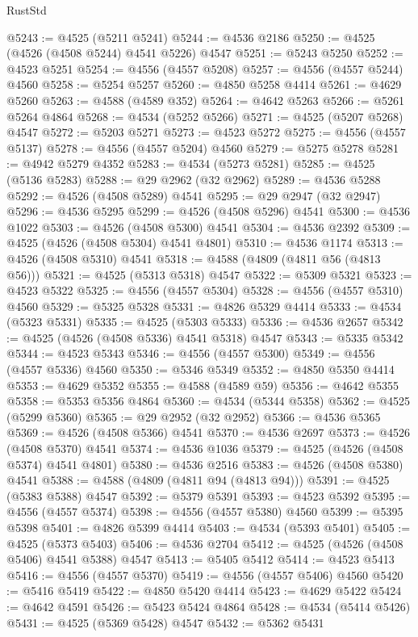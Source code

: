 \begin{lexlean}{RustStd}
\begin{coremodule}
{\begin{coremodule}
{{{{{{{{{{{{{{{{{{{{{{{{{{{{{{{{{{{{{{{{{{{{{{{{{{{{{{{@5243 := @4525 (@5211 @5241)
@5244 := @4536 @2186
@5250 := @4525 (@4526 (@4508 @5244) @4541 @5226) @4547
@5251 := @5243 @5250
@5252 := @4523 @5251
@5254 := @4556 (@4557 @5208)
@5257 := @4556 (@4557 @5244) @4560
@5258 := @5254 @5257
@5260 := @4850 @5258 @4414
@5261 := @4629 @5260
@5263 := @4588 (@4589 @352)
@5264 := @4642 @5263
@5266 := @5261 @5264 @4864
@5268 := @4534 (@5252 @5266)
@5271 := @4525 (@5207 @5268) @4547
@5272 := @5203 @5271
@5273 := @4523 @5272
@5275 := @4556 (@4557 @5137)
@5278 := @4556 (@4557 @5204) @4560
@5279 := @5275 @5278
@5281 := @4942 @5279 @4352
@5283 := @4534 (@5273 @5281)
@5285 := @4525 (@5136 @5283)
@5288 := @29 @2962 (@32 @2962)
@5289 := @4536 @5288
@5292 := @4526 (@4508 @5289) @4541
@5295 := @29 @2947 (@32 @2947)
@5296 := @4536 @5295
@5299 := @4526 (@4508 @5296) @4541
@5300 := @4536 @1022
@5303 := @4526 (@4508 @5300) @4541
@5304 := @4536 @2392
@5309 := @4525 (@4526 (@4508 @5304) @4541 @4801)
@5310 := @4536 @1174
@5313 := @4526 (@4508 @5310) @4541
@5318 := @4588 (@4809 (@4811 @56 (@4813 @56)))
@5321 := @4525 (@5313 @5318) @4547
@5322 := @5309 @5321
@5323 := @4523 @5322
@5325 := @4556 (@4557 @5304)
@5328 := @4556 (@4557 @5310) @4560
@5329 := @5325 @5328
@5331 := @4826 @5329 @4414
@5333 := @4534 (@5323 @5331)
@5335 := @4525 (@5303 @5333)
@5336 := @4536 @2657
@5342 := @4525 (@4526 (@4508 @5336) @4541 @5318) @4547
@5343 := @5335 @5342
@5344 := @4523 @5343
@5346 := @4556 (@4557 @5300)
@5349 := @4556 (@4557 @5336) @4560
@5350 := @5346 @5349
@5352 := @4850 @5350 @4414
@5353 := @4629 @5352
@5355 := @4588 (@4589 @59)
@5356 := @4642 @5355
@5358 := @5353 @5356 @4864
@5360 := @4534 (@5344 @5358)
@5362 := @4525 (@5299 @5360)
@5365 := @29 @2952 (@32 @2952)
@5366 := @4536 @5365
@5369 := @4526 (@4508 @5366) @4541
@5370 := @4536 @2697
@5373 := @4526 (@4508 @5370) @4541
@5374 := @4536 @1036
@5379 := @4525 (@4526 (@4508 @5374) @4541 @4801)
@5380 := @4536 @2516
@5383 := @4526 (@4508 @5380) @4541
@5388 := @4588 (@4809 (@4811 @94 (@4813 @94)))
@5391 := @4525 (@5383 @5388) @4547
@5392 := @5379 @5391
@5393 := @4523 @5392
@5395 := @4556 (@4557 @5374)
@5398 := @4556 (@4557 @5380) @4560
@5399 := @5395 @5398
@5401 := @4826 @5399 @4414
@5403 := @4534 (@5393 @5401)
@5405 := @4525 (@5373 @5403)
@5406 := @4536 @2704
@5412 := @4525 (@4526 (@4508 @5406) @4541 @5388) @4547
@5413 := @5405 @5412
@5414 := @4523 @5413
@5416 := @4556 (@4557 @5370)
@5419 := @4556 (@4557 @5406) @4560
@5420 := @5416 @5419
@5422 := @4850 @5420 @4414
@5423 := @4629 @5422
@5424 := @4642 @4591
@5426 := @5423 @5424 @4864
@5428 := @4534 (@5414 @5426)
@5431 := @4525 (@5369 @5428) @4547
@5432 := @5362 @5431
}}}}}}}}}}}}}}}}}}}}}}}}}}}}}}}}}}}}}}}}}}}}}}}}}}}}}}}
\end{coremodule}}
\end{coremodule}
\end{lexlean}
